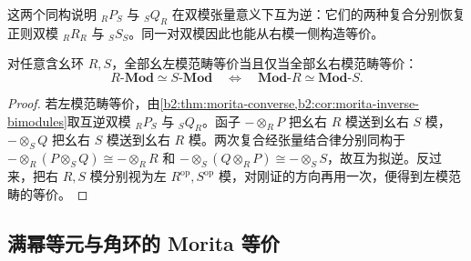 这两个同构说明 \({}_RP_S\) 与 \({}_SQ_R\) 在双模张量意义下互为逆：它们的两种复合分别恢复正则双模 \({}_RR_R\) 与 \({}_SS_S\)。同一对双模因此也能从右模一侧构造等价。

\begin{corollary}\label{b2:cor:morita-left-right}
	对任意含幺环 \(R,S\)，全部幺左模范畴等价当且仅当全部幺右模范畴等价：
	\[
		R\text{-}\mathbf{Mod}\simeq S\text{-}\mathbf{Mod} \quad\Longleftrightarrow\quad \mathbf{Mod}\text{-}R\simeq\mathbf{Mod}\text{-}S.
	\]
\end{corollary}
\begin{proof}
	若左模范畴等价，由\cref{b2:thm:morita-converse,b2:cor:morita-inverse-bimodules}取互逆双模 \({}_RP_S\) 与 \({}_SQ_R\)。函子 \(-\otimes_RP\) 把幺右 \(R\) 模送到幺右 \(S\) 模，\(-\otimes_SQ\) 把幺右 \(S\) 模送到幺右 \(R\) 模。两次复合经张量结合律分别同构于 \(-\otimes_R(P\otimes_SQ)\cong-\otimes_RR\) 和 \(-\otimes_S(Q\otimes_RP)\cong-\otimes_SS\)，故互为拟逆。反过来，把右 \(R,S\) 模分别视为左 \(R^{\mathrm{op}},S^{\mathrm{op}}\) 模，对刚证的方向再用一次，便得到左模范畴的等价。
\end{proof}

\subsection{满幂等元与角环的 Morita 等价}
\label{b2:subsec:1603:03}

